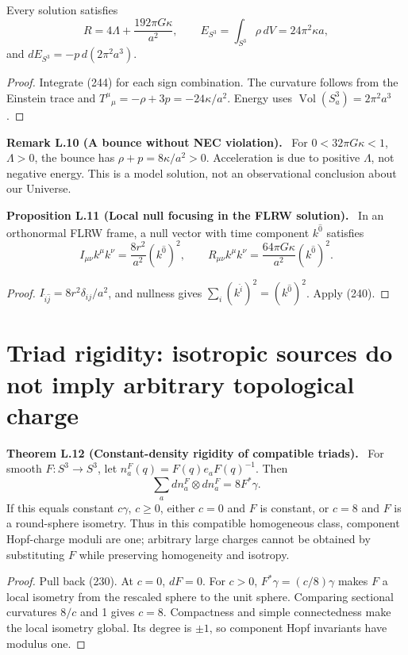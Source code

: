 \documentclass[11pt,a4paper,oneside]{book}
\newcommand{\statement}[3]{\par\medskip\noindent\textbf{#1 #2 (#3).}\ }
\begin{document}
Every solution satisfies
\begin{equation}R=4\Lambda+\frac{192\pi G\kappa}{a^2},\qquad E_{S^3}=\int_{S^3}\rho\,dV=24\pi^2\kappa a,\tag{246}\end{equation}
and $dE_{S^3}=-p\,d(2\pi^2a^3)$.
\begin{proof}
Integrate (244) for each sign combination. The curvature follows from the Einstein trace and $T^\mu{}_{\mu}=-\rho+3p=-24\kappa/a^2$. Energy uses $\operatorname{Vol}(S_a^3)=2\pi^2a^3$.
\end{proof}
\statement{Remark}{L.10}{A bounce without NEC violation}
For $0<32\pi G\kappa<1$, $\Lambda>0$, the bounce has $\rho+p=8\kappa/a^2>0$. Acceleration is due to positive $\Lambda$, not negative energy. This is a model solution, not an observational conclusion about our Universe.
\statement{Proposition}{L.11}{Local null focusing in the FLRW solution}
In an orthonormal FLRW frame, a null vector with time component $k^{\widehat0}$ satisfies
\begin{equation}I_{\mu\nu}k^\mu k^\nu=\frac{8r^2}{a^2}(k^{\widehat0})^2,\qquad R_{\mu\nu}k^\mu k^\nu=\frac{64\pi G\kappa}{a^2}(k^{\widehat0})^2.\tag{247}\end{equation}
\begin{proof}
$I_{\widehat i\widehat j}=8r^2\delta_{ij}/a^2$, and nullness gives $\sum_i(k^{\widehat i})^2=(k^{\widehat0})^2$. Apply (240).
\end{proof}
\section{Triad rigidity: isotropic sources do not imply arbitrary topological charge}
\statement{Theorem}{L.12}{Constant-density rigidity of compatible triads}
For smooth $F:S^3\to S^3$, let $n_a^F(q)=F(q)e_aF(q)^{-1}$. Then
\begin{equation}\sum_a dn_a^F\otimes dn_a^F=8F^*\gamma.\tag{248}\end{equation}
If this equals constant $c\gamma$, $c\ge0$, either $c=0$ and $F$ is constant, or $c=8$ and $F$ is a round-sphere isometry. Thus in this compatible homogeneous class, component Hopf-charge moduli are one; arbitrary large charges cannot be obtained by substituting $F$ while preserving homogeneity and isotropy.
\begin{proof}
Pull back (230). At $c=0$, $dF=0$. For $c>0$, $F^*\gamma=(c/8)\gamma$ makes $F$ a local isometry from the rescaled sphere to the unit sphere. Comparing sectional curvatures $8/c$ and 1 gives $c=8$. Compactness and simple connectedness make the local isometry global. Its degree is $\pm1$, so component Hopf invariants have modulus one.
\end{proof}
\end{document}
